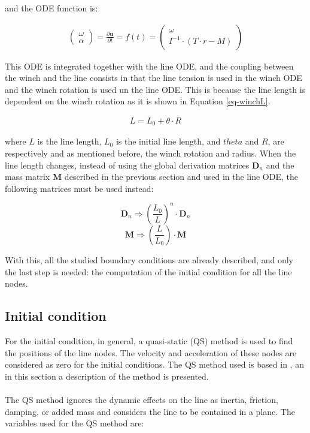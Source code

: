 \documentclass[10pt] {article}
\newcommand{\bean}{\begin{eqnarray}}
\newcommand{\eean}{\end{eqnarray}}
\newcommand{\ba}{\begin{array}}
\newcommand{\ea}{\end{array}}
\newcommand{\pa}{\partial}
\begin{document}
and the ODE function is:

\bean
\left(\ba{c} \omega \\ \alpha \ea\right) = \frac{\pa\mathbf{u}}{\pa t} = f(t) = \left(\ba{c} \omega \\ I^{-1}\cdot(T\cdot r - M) \ea\right)
\label{system-function-winch}
\eean

This ODE is integrated together with the line ODE, and the coupling between the winch and the line consists in that the line tension is used in the winch ODE and the winch rotation is used un the line ODE. This is because the line length is dependent on the winch rotation as it is shown in Equation \ref{eq-winchL}.

\bean L = L_0 + \theta\cdot R \label{eq-winchL}\eean

where $L$ is the line length, $L_0$ is the initial line length, and $theta$ and $R$, are respectively and as mentioned before, the winch rotation and radius. When the line length changes, instead of using the global derivation matrices $\mathbf{D}_n$ and the mass matrix $\mathbf{M}$ described in the previous section and used in the line ODE, the following matrices must be used instead:

$$\mathbf{D}_n \Rightarrow \left(\frac{L_0}{L}\right)^n\cdot\mathbf{D}_n$$
$$\mathbf{M} \Rightarrow \left(\frac{L}{L_0}\right)\cdot\mathbf{M}$$

With this, all the studied boundary conditions are already described, and only the last step is needed: the computation of the initial condition for all the line nodes.

\vspace{1cm}

\subsection{Initial condition}

For the initial condition, in general, a quasi-static (QS) method is used to find the positions of the line nodes. The velocity and acceleration of these nodes are considered as zero for the initial conditions. The QS method used is based in \cite{faltinsen}, an in this section a description of the method is presented. \\ \\

The QS method ignores the dynamic effects on the line as inertia, friction, damping, or added mass and considers the line to be contained in a plane. The variables used for the QS method are:\\ \\
\end{document}
